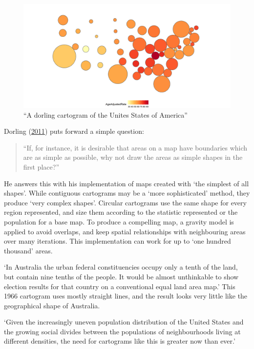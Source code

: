 \documentclass[11pt,]{article}
\begin{document}
\begin{figure}
\centering
\includegraphics{figures/ggdorl.png}
\caption{``A dorling cartogram of the Unites States of America''}
\end{figure}

Dorling (\protect\hyperlink{ref-ACTUC}{2011}) puts forward a simple
question:

\begin{quote}
``If, for instance, it is desirable that areas on a map have boundaries
which are as simple as possible, why not draw the areas as simple shapes
in the first place?''
\end{quote}

He answers this with his implementation of maps created with `the
simplest of all shapes'. While contiguous cartograms may be a `more
sophisticated' method, they produce `very complex shapes'. Circular
cartograms use the same shape for every region represented, and size
them according to the statistic represented or the population for a base
map. To produce a compelling map, a gravity model is applied to avoid
overlaps, and keep spatial relationships with neighbouring areas over
many iterations. This implementation can work for up to `one hundred
thousand' areas.

`In Australia the urban federal constituencies occupy only a tenth of
the land, but contain nine tenths of the people. It would be almost
unthinkable to show election results for that country on a conventional
equal land area map.' This 1966 cartogram uses mostly straight lines,
and the result looks very little like the geographical shape of
Australia.

`Given the increasingly uneven population distribution of the United
States and the growing social divides between the populations of
neighbourhoods living at different densities, the need for cartograms
like this is greater now than ever.'
\end{document}
